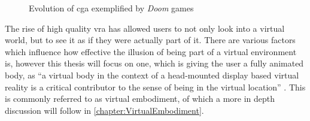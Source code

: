 \begin{figure}[!tbp]
  \centering
  \hfill
  \caption{Evolution of \gls{cga} exemplified by \textit{Doom} games}
  \label{fig:doom1993vs2016}
\end{figure}

The rise of high quality \gls{vra} has allowed users to not only look into a virtual world, but to see it as if they were actually part of it. There are various factors which influence how effective the illusion of being part of a virtual environment is, however this thesis will focus on one, which is giving the user a fully animated body, as \enquote{a virtual body in the context of a head-mounted display based virtual reality is a critical contributor to the sense of being in the virtual location} \autocite[p.~374]{senseEmbodimentVR}. This is commonly referred to as virtual embodiment, of which a more in depth discussion will follow in \autoref{chapter:VirtualEmbodiment}.
\newline


